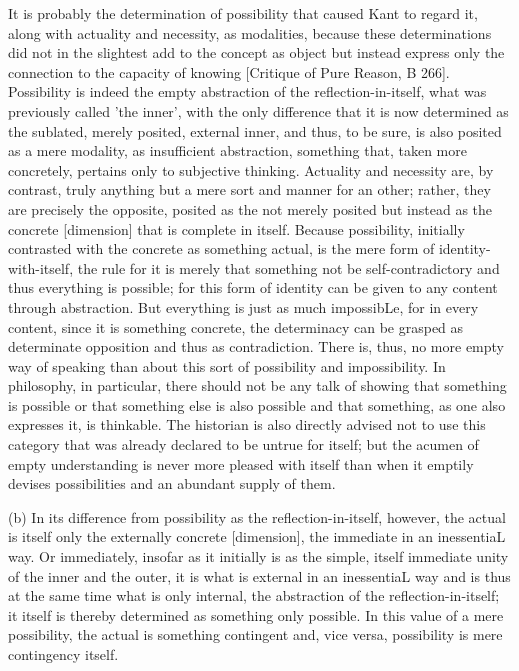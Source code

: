 It is probably the determination of possibility that caused Kant to
regard it, along with actuality and necessity, as modalities,
because these determinations did not in the slightest add to the concept
as object but instead express only the connection to the
capacity of knowing [Critique of Pure Reason, B 266].
Possibility is indeed the empty abstraction of the reflection-in-itself,
what was previously called 'the inner', with the only difference that it is now
determined as the sublated, merely posited, external inner, and thus,
to be sure, is also posited as a mere modality, as insufficient
abstraction, something that, taken more concretely, pertains only to
subjective thinking.
Actuality and necessity are, by contrast, truly
anything but a mere sort and manner for an other; rather, they are
precisely the opposite, posited as the not merely posited but instead
as the concrete [dimension] that is complete in itself.
Because possibility, initially contrasted with
the concrete as something actual,
is the mere form of identity-with-itself,
the rule for it is merely that something not be self-contradictory and
thus everything is possible;
for this form of identity can be given to any content through abstraction.
But everything is just as much impossibLe, for in
every content, since it is something concrete, the determinacy can
be grasped as determinate opposition and thus as contradiction.
There is, thus, no more empty way of speaking than about this sort
of possibility and impossibility.
In philosophy, in particular, there should not be any talk of showing that
something is possible or that something else is also possible and
that something, as one also expresses it, is thinkable.
The historian is also directly advised not to use this
category that was already declared to be untrue for itself;
but the acumen of empty understanding is never more pleased with itself
than when it emptily devises possibilities and an abundant supply of them.

(b) In its difference from possibility as the reflection-in-itself, however,
the actual is itself only the externally concrete [dimension], the immediate
in an inessentiaL way. Or immediately, insofar as it initially is as
the simple, itself immediate unity of the inner and the outer, it is what is
external in an inessentiaL way and is thus at the same time what is
only internal, the abstraction of the reflection-in-itself; it itself is thereby
determined as something only possible. In this value of a mere possibility,
the actual is something contingent and, vice versa, possibility is
mere contingency itself.

